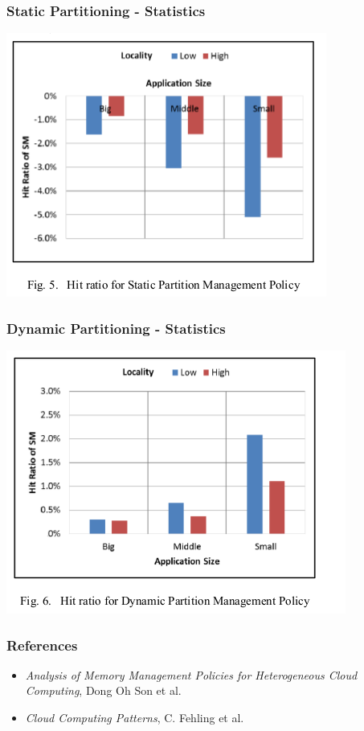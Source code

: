 \documentclass{beamer}
\begin{document}
\begin{frame}
\frametitle{Static Partitioning - Statistics}
\begin{center}
\includegraphics[width=.6\textwidth]{static-stat}
\end{center}

\end{frame}



\begin{frame}

\frametitle{Dynamic Partitioning - Statistics}
\begin{center}
\includegraphics[width=.6\textwidth]{dynamic-stat}
\end{center}

\end{frame}

\begin{frame}

\frametitle{References}
\begin{itemize}
\item \textit{Analysis of Memory Management Policies for Heterogeneous Cloud Computing}, Dong Oh Son et al.
\item  \textit{Cloud Computing Patterns}, C. Fehling et al.

 

\end{itemize}

\end{frame}
\end{document}
